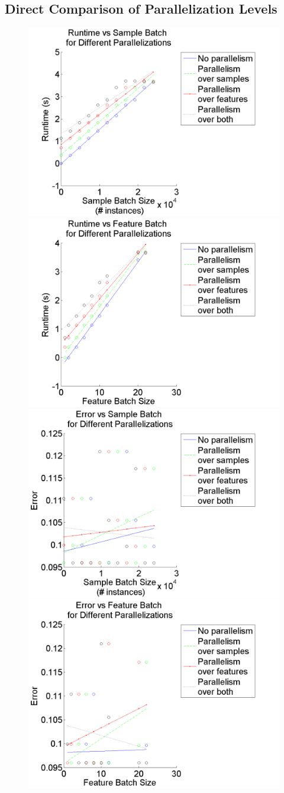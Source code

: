 \documentclass{article}
\begin{document}
\subsection{Direct Comparison of Parallelization Levels}
\begin{figure}
\centering
\includegraphics[width = .4\linewidth]{time_samp}
\includegraphics[width = .4\linewidth]{time_feat}
\includegraphics[width = .4\linewidth]{err_samp}
\includegraphics[width = .4\linewidth]{err_feat}
\caption{}
\end{figure}
\end{document}
